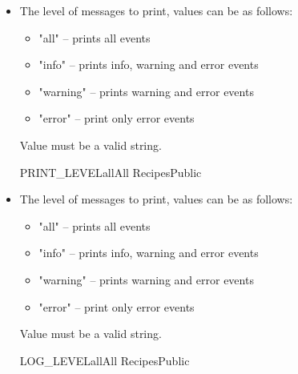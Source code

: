 \begin{itemize}

\item {}
{The level of messages to print, values can be as follows:
\begin{itemize}
	\item "all" -- prints all events
	\item "info" -- prints info, warning and error events
	\item "warning" -- prints warning and error events
	\item "error" -- print only error events
\end{itemize}
Value must be a valid string.
}
{PRINT\_LEVEL}{all}{All Recipes}{\configtxtfile}{}{Public}

\item {}
{The level of messages to print, values can be as follows:
\begin{itemize}
	\item "all" -- prints all events
	\item "info" -- prints info, warning and error events
	\item "warning" -- prints warning and error events
	\item "error" -- print only error events
\end{itemize}
Value must be a valid string.
}
{LOG\_LEVEL}{all}{All Recipes}{\configtxtfile}{}{Public}

\end{itemize}